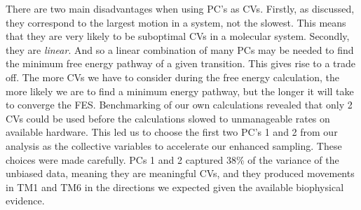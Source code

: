 There are two main disadvantages when using PC's as CVs. Firstly, as discussed, they correspond to the largest motion in a system, not the slowest. This means that they are very likely to be suboptimal CVs in a molecular system. Secondly, they are \textit{linear}. And so a linear combination of many PCs may be needed to find the minimum free energy pathway of a given transition. This gives rise to a trade off. The more CVs we have to consider during the free energy calculation, the more likely we are to find a minimum energy pathway, but the longer it will take to converge the FES. Benchmarking of our own calculations revealed that only 2 CVs could be used before the calculations slowed to unmanageable rates on available hardware. This led us to choose the first two PC's 1 and 2 from our analysis as the collective variables to accelerate our enhanced sampling. These choices were made carefully. PCs 1 and 2 captured 38\% of the variance of the unbiased data, meaning they are meaningful CVs, and they produced movements in TM1 and TM6 in the directions we expected given the available biophysical evidence. 

